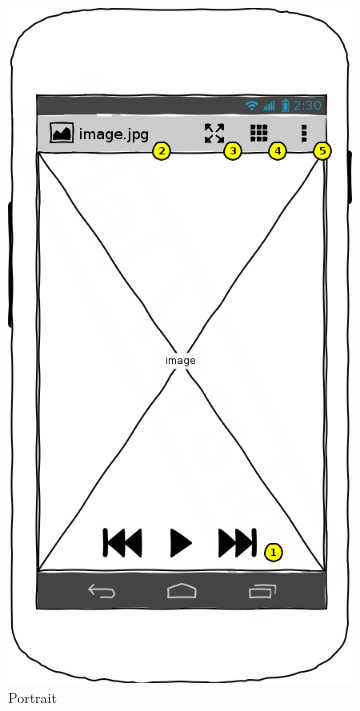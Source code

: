 \documentclass[a4paper,11pt]{article}
\begin{document}
\begin{figure}[t]
	\begin{subfigure}{0.5\textwidth}
		\centering
		\includegraphics[scale=0.4]{default-portrait}
		\caption{Portrait}
		\label{dp}
	\end{subfigure}
	~
	\begin{subfigure}{0.5\textwidth}
		\centering

\end{subfigure}
\end{figure}
\end{document}
